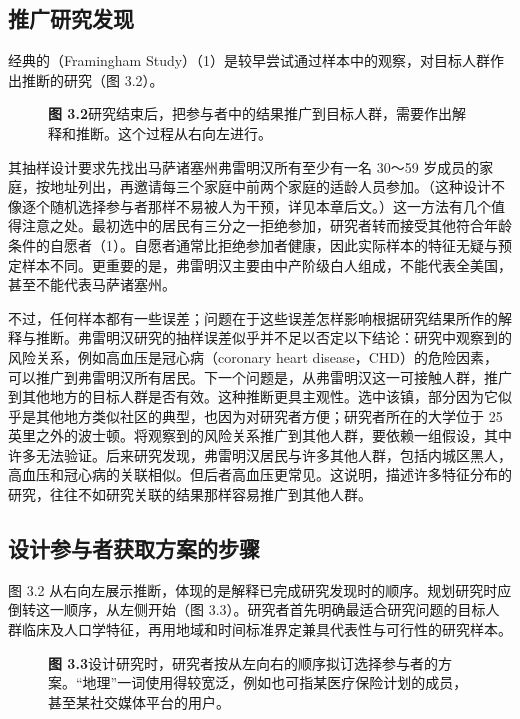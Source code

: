 \subsection{推广研究发现}
经典的（Framingham Study）（1）是较早尝试通过样本中的观察，对目标人群作出推断的研究（图 3.2）。
\par
\begin{figure}[htbp]\centering\resizebox{\linewidth}{!}{\chthreegeneralize}
\caption*{\textbf{图 3.2}\quad 研究结束后，把参与者中的结果推广到目标人群，需要作出解释和推断。这个过程从右向左进行。}
\end{figure}\par
{}
其抽样设计要求先找出马萨诸塞州弗雷明汉所有至少有一名 30～59 岁成员的家庭，按地址列出，再邀请每三个家庭中前两个家庭的适龄人员参加。（这种设计不像逐个随机选择参与者那样不易被人为干预，详见本章后文。）这一方法有几个值得注意之处。最初选中的居民有三分之一拒绝参加，研究者转而接受其他符合年龄条件的自愿者（1）。自愿者通常比拒绝参加者健康，因此实际样本的特征无疑与预定样本不同。更重要的是，弗雷明汉主要由中产阶级白人组成，不能代表全美国，甚至不能代表马萨诸塞州。

不过，任何样本都有一些误差；问题在于这些误差怎样影响根据研究结果所作的解释与推断。弗雷明汉研究的抽样误差似乎并不足以否定以下结论：研究中观察到的风险关系，例如高血压是冠心病（coronary heart disease，CHD）的危险因素，可以推广到弗雷明汉所有居民。下一个问题是，从弗雷明汉这一可接触人群，推广到其他地方的目标人群是否有效。这种推断更具主观性。选中该镇，部分因为它似乎是其他地方类似社区的典型，也因为对研究者方便；研究者所在的大学位于 25 英里之外的波士顿。将观察到的风险关系推广到其他人群，要依赖一组假设，其中许多无法验证。后来研究发现，弗雷明汉居民与许多其他人群，包括内城区黑人，高血压和冠心病的关联相似。但后者高血压更常见。这说明，描述许多特征分布的研究，往往不如研究关联的结果那样容易推广到其他人群。

\subsection{设计参与者获取方案的步骤}
图 3.2 从右向左展示推断，体现的是解释已完成研究发现时的顺序。规划研究时应倒转这一顺序，从左侧开始（图 3.3）。研究者首先明确最适合研究问题的目标人群临床及人口学特征，再用地域和时间标准界定兼具代表性与可行性的研究样本。
\par
\begin{figure}[htbp]\centering\resizebox{\linewidth}{!}{\chthreesteps}
\caption*{\textbf{图 3.3}\quad 设计研究时，研究者按从左向右的顺序拟订选择参与者的方案。“地理”一词使用得较宽泛，例如也可指某医疗保险计划的成员，甚至某社交媒体平台的用户。}
\end{figure}\par

